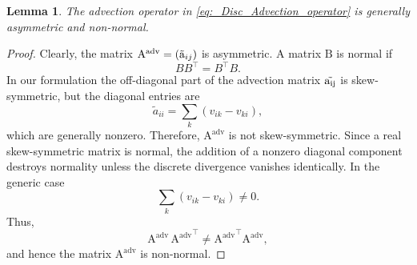 \documentclass[10pt,a4paper]{amsart}
\newtheorem{lemma}{Lemma}
\begin{document}
\begin{lemma}
The advection operator in \eqref{eq:_Disc_Advection_operator} is
generally asymmetric and non-normal.
\end{lemma}

\begin{proof}
Clearly, the matrix $\mathrm{A^{adv}}=(\mathrm{\Tilde{a}}_{ij})$ is asymmetric. A matrix $\mathrm{B}$ is normal if
\[
B B^{\top}
=
B^{\top}B.
\]
In our formulation the off-diagonal part of the advection matrix $\mathrm{\Tilde{a_{ij}}}$ is skew-symmetric,
but the diagonal entries are
\[
\widetilde a_{ii}
=
\sum_{k}(v_{ik}-v_{ki}),
\]
which are generally nonzero. Therefore, $\mathrm{A^{adv}} $ is not skew-symmetric. Since a real skew-symmetric matrix is normal,
the addition of a nonzero diagonal component destroys normality
unless the discrete divergence vanishes identically.
In the generic case 
\[
\sum_{k}(v_{ik}-v_{ki}) \neq 0.
\]
Thus, 
\[
\mathrm{A^{adv}}\, \mathrm{A^{adv}}^{\top}
\neq
\mathrm{A^{adv}}^{\top}\mathrm{A^{adv}},
\]
and hence the matrix $\mathrm{A^{adv}}$ is non-normal.
\end{proof}
\end{document}
